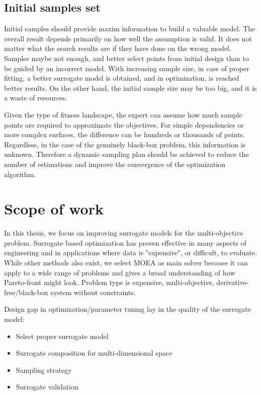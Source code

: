         \subsection{Initial samples set}
        Initial samples should provide maxim information to build a valuable model. The overall result depends primarily on how well the assumption is valid. It does not matter what the search results are if they have done on the wrong model. Samples maybe not enough, and better select points from initial design than to be guided by an incorrect model. With increasing sample size, in case of proper fitting, a better surrogate model is obtained, and in optimization, is reached better results. On the other hand, the initial sample size may be too big, and it is a waste of resources. 

        Given the type of fitness landscape, the expert can assume how much sample points are required to approximate the objectives. For simple dependencies or more complex surfaces, the difference can be hundreds or thousands of points. Regardless, in the case of the genuinely black-box problem, this information is unknown. Therefore a dynamic sampling plan should be achieved to reduce the number of estimations and improve the convergence of the optimization algorithm.


    \section{Scope of work}
        In this thesis, we focus on improving surrogate models for the multi-objective problem. Surrogate based optimization has proven effective in many aspects of engineering and in applications where data is "expensive", or difficult, to evaluate. While other methods also exist, we select MOEA as main solver because it can apply to a wide range of problems and gives a broad understanding of how Pareto-front might look. Problem type is expensive, multi-objective, derivative-free/black-box system without constraints.

        Design gap in optimization/parameter tuning lay in the quality of the surrogate model:
            \begin{itemize}
                \item Select proper surrogate model
                \item Surrogate composition for multi-dimensional space
                \item Sampling strategy
                \item Surrogate validation
            \end{itemize}

